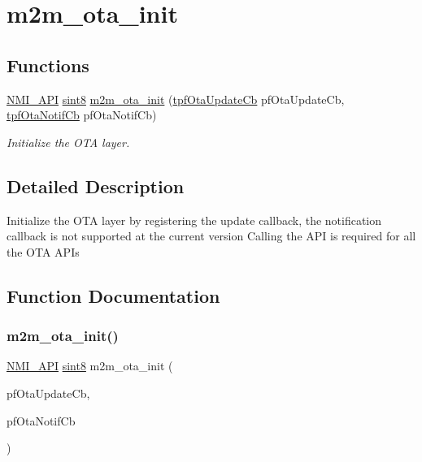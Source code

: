 \hypertarget{group__OtaInitFn}{}\section{m2m\+\_\+ota\+\_\+init}
\label{group__OtaInitFn}
\subsection*{Functions}
\begin{DoxyCompactItemize}
\item 
\hyperlink{group__BSPDefine_gaecc0323d771e41ef81a76b5f12783e22}{N\+M\+I\+\_\+\+A\+PI} \hyperlink{group__DataT_gae35f10ffd0ac8dd2bc3e794da9bdfbc7}{sint8} \hyperlink{group__OtaInitFn_gacd2a1a8ffaccc3deb1970cf1ad41ceec}{m2m\+\_\+ota\+\_\+init} (\hyperlink{group__OTATYPEDEF_ga86bdacc22dca0d0844e0825d81fb4f85}{tpf\+Ota\+Update\+Cb} pf\+Ota\+Update\+Cb, \hyperlink{group__OTATYPEDEF_gaa3fadd9ab95ba91a4f32c702dd5104d8}{tpf\+Ota\+Notif\+Cb} pf\+Ota\+Notif\+Cb)
\begin{DoxyCompactList}\small\item\em Initialize the O\+TA layer. \end{DoxyCompactList}\end{DoxyCompactItemize}


\subsection{Detailed Description}
Initialize the O\+TA layer by registering the update callback, the notification callback is not supported at the current version Calling the A\+PI is required for all the O\+TA A\+PI\textquotesingle{}s 

\subsection{Function Documentation}
\mbox{\label{group__OtaInitFn_gacd2a1a8ffaccc3deb1970cf1ad41ceec}} 
\subsubsection{\texorpdfstring{m2m\+\_\+ota\+\_\+init()}{m2m\_ota\_init()}}
{\footnotesize\ttfamily \hyperlink{group__BSPDefine_gaecc0323d771e41ef81a76b5f12783e22}{N\+M\+I\+\_\+\+A\+PI} \hyperlink{group__DataT_gae35f10ffd0ac8dd2bc3e794da9bdfbc7}{sint8} m2m\+\_\+ota\+\_\+init (\begin{DoxyParamCaption}\item[{\hyperlink{group__OTATYPEDEF_ga86bdacc22dca0d0844e0825d81fb4f85}{tpf\+Ota\+Update\+Cb}}]{pf\+Ota\+Update\+Cb,  }\item[{\hyperlink{group__OTATYPEDEF_gaa3fadd9ab95ba91a4f32c702dd5104d8}{tpf\+Ota\+Notif\+Cb}}]{pf\+Ota\+Notif\+Cb }\end{DoxyParamCaption})}



